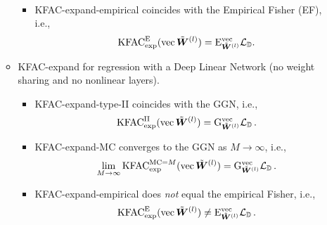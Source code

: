 \begin{itemize}
\begin{itemize}
\begin{itemize}
\begin{align*}
            \end{align*}
          \item KFAC-expand-empirical coincides with the Empirical Fisher (EF), i.e.,
            \begin{align*}
              \mathrm{KFAC}^{\text{E}}_{\text{exp}}(\operatorname{vec}\tilde{{\bm{W}}}^{(l)}) = \mathrm{E}^{\operatorname{vec}}_{\tilde{{\bm{W}}}^{(l)}}{\mathcal{L}}_{{\mathbb{D}}}.
            \end{align*}
        \end{itemize}
      \item KFAC-expand for regression with a Deep Linear Network (no weight sharing and no nonlinear layers).
        \begin{itemize}
          \item KFAC-expand-type-II coincides with the GGN, i.e.,
            \begin{align*}
              \mathrm{KFAC}^{\text{II}}_{\text{exp}}(\operatorname{vec} \tilde{{\bm{W}}}^{(l)}) = \mathrm{G}^{\operatorname{vec}}_{\tilde{{\bm{W}}}^{(l)}} {\mathcal{L}}_{{\mathbb{D}}}\,.
            \end{align*}
          \item KFAC-expand-MC converges to the GGN as $M\rightarrow\infty$, i.e., 
            \begin{align*}
              \lim_{M \to \infty} \mathrm{KFAC}^{\text{MC}=M}_{\text{exp}}(\operatorname{vec} \tilde{{\bm{W}}}^{(l)}) = \mathrm{G}^{\operatorname{vec}}_{\tilde{{\bm{W}}}^{(l)}} {\mathcal{L}}_{{\mathbb{D}}}\,.
            \end{align*}
          \item KFAC-expand-empirical does \emph{not} equal the empirical Fisher, i.e.,
            \begin{align*}
              \mathrm{KFAC}_{\text{exp}}^{\text{E}}(\operatorname{vec} \tilde{{\bm{W}}}^{(l)})
              \neq
              \mathrm{E}^{\operatorname{vec}}_{\tilde{{\bm{W}}}^{(l)}} {\mathcal{L}}_{{\mathbb{D}}}\,.
            \end{align*}         
        \end{itemize}
      \end{itemize}
    \end{itemize}
